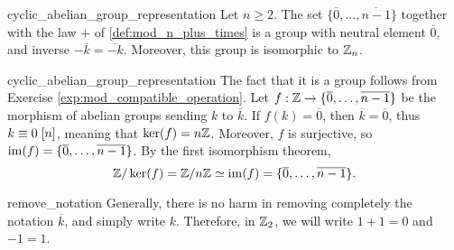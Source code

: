 \begin{cprop}{}{cyclic_abelian_group_representation}
    Let \( n \geq 2 \). The set \( \{ \overline 0, \dots, \overline {n-1} \} \) together with the law \( + \) of \ref{def:mod_n_plus_times} is a group with neutral element \( \overline 0 \), and inverse \( - \overline k = \overline{- k}  \). Moreover, this group is isomorphic to \( \mathbb{Z}_n \).
\end{cprop}
\begin{propproof}{cyclic_abelian_group_representation}
    The fact that it is a group follows from Exercise \ref{exp:mod_compatible_operation}. Let \( f : \mathbb{Z} \to \{ \overline 0, \dots, \overline {n-1} \} \) be the morphism of abelian groups sending \( k \) to \( \overline k \). If \( f(k) = \overline 0 \), then \( \overline k = \overline 0 \), thus \( k \equiv 0 \;[{n}]  \), meaning that \( \ker(f) = n\mathbb{Z} \). Moreover, \( f \) is surjective, so \( \operatorname{im}(f) = \{ \overline 0, \dots, \overline {n-1} \} \). By the first isomorphism theorem, 
    \begin{equation*}
        \mathbb{Z} / \ker(f) = \mathbb{Z} / n\mathbb{Z} \simeq \operatorname{im}(f) = \{ \overline 0, \dots, \overline {n-1} \}. 
    \end{equation*}
\end{propproof}

\begin{crem}{}{remove_notation}
    Generally, there is no harm in removing completely the notation \( \overline k \), and simply write \( k \). Therefore, in \( \mathbb{Z}_2 \), we will write \( 1 + 1 = 0 \) and \( -1 = 1 \).
\end{crem}



